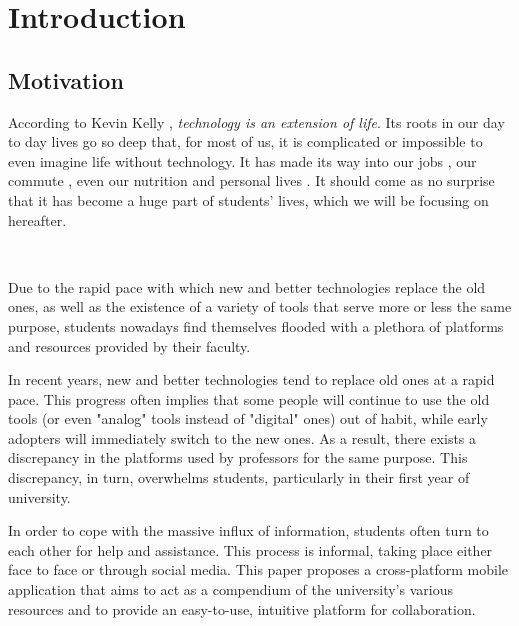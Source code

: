 \chapter{Introduction} \label{chapter1}

\section{Motivation} \label{1:motivation}

    According to Kevin Kelly \cite{kelly2010technology}, \textit{technology is an extension of life}. Its roots in our day to day lives go so deep that, for most of us, it is complicated or impossible to even imagine life without technology. It has made its way into our jobs \cite{lewis1996studying}, our commute \cite{kairi2019technology}, even our nutrition \cite{lewis2010role} and personal lives \cite{mcquillen2003influence}. It should come as no surprise that it has become a huge part of students' lives, which we will be focusing on hereafter.
    
    ~
    
    Due to the rapid pace with which new and better technologies replace the old ones, as well as the existence of a variety of tools that serve more or less the same purpose, students nowadays find themselves flooded with a plethora of platforms and resources provided by their faculty.
    
    In recent years, new and better technologies tend to replace old ones at a rapid pace. This progress often implies that some people will continue to use the old tools (or even "analog" tools instead of "digital" ones) out of habit, while early adopters will immediately switch to the new ones. As a result, there exists a discrepancy in the platforms used by professors for the same purpose. This discrepancy, in turn, overwhelms students, particularly in their first year of university.
    
    
    In order to cope with the massive influx of information, students often turn to each other for help and assistance. This process is informal, taking place either face to face or through social media.
    \clearpage
    This paper proposes a cross-platform mobile application that aims to act as a compendium of the university's various resources and to provide an easy-to-use, intuitive platform for collaboration.

